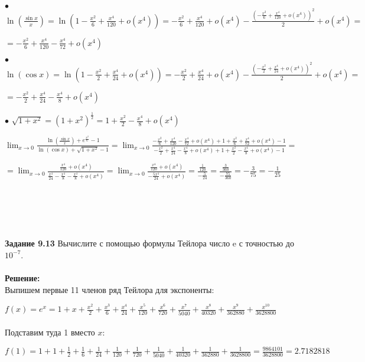 \documentclass[a4paper, 12pt]{article}
\begin{document}
    \par $\bullet$ $\ln{\left(\frac{\sin{x}}{x}\right)} = \ln{\left(1 - \frac{x^2}{6} + \frac{x^4}{120} + o(x^4)\right)} = - \frac{x^2}{6} + \frac{x^4}{120} + o(x^4) - \frac{\left(- \frac{x^2}{6} + \frac{x^4}{120} + o(x^4)\right)^2}{2} + o(x^4) = $\par$ = -\frac{x^2}{6} + \frac{x^4}{120} - \frac{x^4}{72} + o(x^4)$
    \\
    \par $\bullet$ $\ln{(\cos{x})} = \ln{\left(1 - \frac{x^2}{2} + \frac{x^4}{24} + o(x^4)\right)} = - \frac{x^2}{2} + \frac{x^4}{24} + o(x^4) - \frac{\left(- \frac{x^2}{2} + \frac{x^4}{24} + o(x^4)\right)^2}{2} + o(x^4) = $\par$ = - \frac{x^2}{2} + \frac{x^4}{24} - \frac{x^4}{8} + o(x^4)$
    \\
    \par $\bullet$ $\sqrt{1 + x^2} = (1 + x^2)^{\frac{1}{2}} = 1 + \frac{x^2}{2} - \frac{x^4}{8} + o(x^4)$
    \\
    \par $\lim_{x \to 0} \frac{\ln{(\frac{\sin{x}}{x}) +e^{\frac{x^2}{6}} - 1}}{\ln{(\cos{x})} + \sqrt{1 + x^2} - 1} = \lim_{x \to 0} \frac{-\frac{x^2}{6} + \frac{x^4}{120} - \frac{x^4}{72} + o(x^4) + 1 + \frac{x^2}{6} + \frac{x^4}{72} + o(x^4) - 1}{- \frac{x^2}{2} + \frac{x^4}{24} - \frac{x^4}{8} + o(x^4) + 1 + \frac{x^2}{2} - \frac{x^4}{8} + o(x^4) - 1} = $\\ \par$ = \lim_{x \to 0} \frac{\frac{x^4}{120} + o(x^4)}{\frac{x^4}{24} - \frac{x^4}{8} - \frac{x^4}{8} + o(x^4)} = \lim_{x \to 0} \frac{\frac{x^4}{120} + o(x^4)}{-\frac{5x^4}{24} + o(x^4)} = \frac{\frac{1}{120}}{-\frac{5}{24}} = \frac{\frac{3}{360}}{-\frac{75}{360}} = -\frac{3}{75} = -\frac{1}{25}$
    \\
    \\
    \\
    \\
    \\
    \\ \textbf{Задание 9.13} Вычислите с помощью формулы Тейлора число e с точностью до $10^{-7}$.
    \\
    \\ \textbf{Решение: } 
    \\ Выпишем первые 11 членов ряд Тейлора для экспоненты: 
    \par $f(x) = e^{x} = 1 + x + \frac{x^2}{2} + \frac{x^3}{6} + \frac{x^4}{24} + \frac{x^5}{120} + \frac{x^6}{720} + \frac{x^7}{5040} + \frac{x^8}{40320} + \frac{x^9}{362880} + \frac{x^{10}}{3628800}$
    \\
    \\ Подставим туда 1 вместо $x$: 
    \par $f(1) = 1 + 1 + \frac{1}{2} + \frac{1}{6} + \frac{1}{24} + \frac{1}{120} + \frac{1}{720} + \frac{1}{5040} + \frac{1}{40320} + \frac{1}{362880} + \frac{1}{3628800} = \frac{9864101}{3628800} = 2.7182818$
\end{document}
